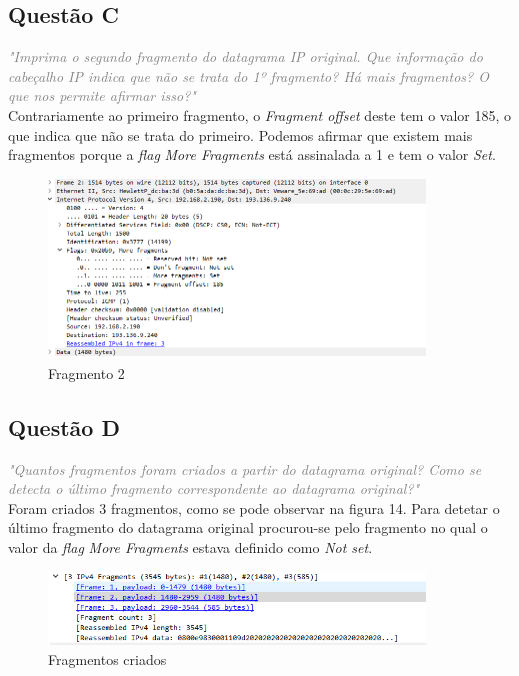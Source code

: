 \documentclass{llncs}
\newcommand{\questionE}[1]{\textcolor{gray}{\textit{"#1"}}}
\begin{document}
\subsection{Questão C}
\hspace{3mm} 
\questionE{Imprima o segundo fragmento do datagrama IP original. Que informação do cabeçalho IP indica que não se trata do 1º fragmento? Há mais fragmentos? O que nos permite afirmar isso?}\\ 

Contrariamente ao primeiro fragmento, o \textit{Fragment offset} deste tem o valor 185, o que indica que não se trata do primeiro. Podemos afirmar que existem mais fragmentos porque a \textit{flag} \textit{More Fragments} está assinalada a 1 e tem o valor \textit{Set}.

\begin{figure}[H]
\begin{center}
\includegraphics[width=10cm]{3cfragmento2.PNG}
\end{center}
\caption{Fragmento 2}
\end{figure}

\subsection{Questão D}
\hspace{3mm}
\questionE{Quantos fragmentos foram criados a partir do datagrama original? Como se detecta o último fragmento correspondente ao datagrama original?}\\

Foram criados 3 fragmentos, como se pode observar na figura 14. Para detetar o último fragmento do datagrama original procurou-se pelo fragmento no qual o valor da \textit{flag} \textit{More Fragments} estava definido como \textit{Not set}. 

\begin{figure}[H]
\begin{center}
\includegraphics[width=10cm]{3d.PNG}
\end{center}
\caption{Fragmentos criados}
\end{figure}
\end{document}

